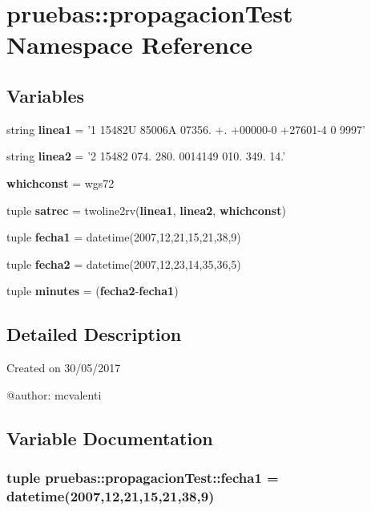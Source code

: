 \section{pruebas\-:\-:propagacion\-Test \-Namespace \-Reference}
\label{namespacepruebas_1_1propagacion_test}
\subsection*{\-Variables}
\begin{DoxyCompactItemize}
\item 
string {\bf linea1} = '1 15482\-U 85006\-A 07356. +. +00000-\/0 +27601-\/4 0 9997'
\item 
string {\bf linea2} = '2 15482 074. 280. 0014149 010. 349. 14.'
\item 
{\bf whichconst} = wgs72
\item 
tuple {\bf satrec} = twoline2rv({\bf linea1}, {\bf linea2}, {\bf whichconst})
\item 
tuple {\bf fecha1} = datetime(2007,12,21,15,21,38,9)
\item 
tuple {\bf fecha2} = datetime(2007,12,23,14,35,36,5)
\item 
tuple {\bf minutes} = ({\bf fecha2}-\/{\bf fecha1})
\end{DoxyCompactItemize}


\subsection{\-Detailed \-Description}
\begin{DoxyVerb}
Created on 30/05/2017

@author: mcvalenti
\end{DoxyVerb}
 

\subsection{\-Variable \-Documentation}
\subsubsection[{fecha1}]{\setlength{\rightskip}{0pt plus 5cm}tuple {\bf pruebas\-::propagacion\-Test\-::fecha1} = datetime(2007,12,21,15,21,38,9)}\label{namespacepruebas_1_1propagacion_test_a7132b95a298da5196a041e755372a3bd}


